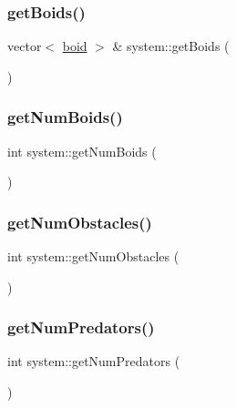 \subsubsection{\texorpdfstring{get\+Boids()}{getBoids()}}
{\footnotesize\ttfamily vector$<$ \mbox{\hyperlink{classboid}{boid}} $>$ \& system\+::get\+Boids (\begin{DoxyParamCaption}{ }\end{DoxyParamCaption})}

\mbox{\label{classsystem_af395f2699934146ba390133e024afc37}} 
\subsubsection{\texorpdfstring{get\+Num\+Boids()}{getNumBoids()}}
{\footnotesize\ttfamily int system\+::get\+Num\+Boids (\begin{DoxyParamCaption}{ }\end{DoxyParamCaption})}

\mbox{\label{classsystem_a07f912943ebfac2bbc8497caca597c16}} 
\subsubsection{\texorpdfstring{get\+Num\+Obstacles()}{getNumObstacles()}}
{\footnotesize\ttfamily int system\+::get\+Num\+Obstacles (\begin{DoxyParamCaption}{ }\end{DoxyParamCaption})}

\mbox{\label{classsystem_a10cfb00d926b669bd352fc9f77872e53}} 
\subsubsection{\texorpdfstring{get\+Num\+Predators()}{getNumPredators()}}
{\footnotesize\ttfamily int system\+::get\+Num\+Predators (\begin{DoxyParamCaption}{ }\end{DoxyParamCaption})}

